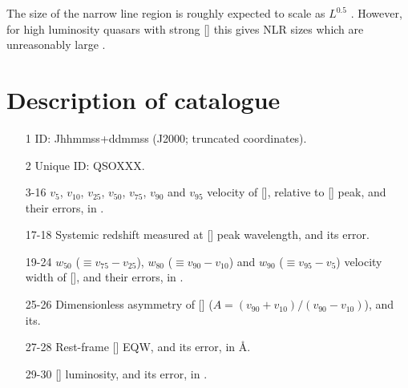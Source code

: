 The size of the narrow line region is roughly expected to scale as $L^{0.5}$ \citep[e.g.][]{netzer04}. 
However, for high luminosity quasars with strong [] this gives \ac{NLR} sizes which are unreasonably large \citep[$\sim$100 kpc;][]{netzer04}. 




\section{Description of catalogue}

\begin{itemize}
    
  \item[1] ID: Jhhmmss+ddmmss (J2000; truncated coordinates).
  
  \item[2] Unique ID: QSOXXX.
  
  \item[3-16] $v_{5}$, $v_{10}$, $v_{25}$, $v_{50}$, $v_{75}$, $v_{90}$ and $v_{95}$ velocity of [], relative to [] peak, and their errors, in \kms.  

  \item[17-18] Systemic redshift measured at [] peak wavelength, and its error. 

  \item[19-24] $w_{50}$ ($\equiv v_{75} - v_{25}$), $w_{80}$ ($\equiv v_{90} - v_{10}$) and $w_{90}$ ($\equiv v_{95} - v_{5}$) velocity width of [], and their errors, in \kms.

  \item[25-26] Dimensionless asymmetry of [] ($A = (v_{90} + v_{10}) / (v_{90} - v_{10})$), and its.  

  \item[27-28] Rest-frame [] EQW, and its error, in \AA.

  \item[29-30] [\ion{O}{III}] luminosity, and its error, in \ergs. 






\end{itemize}





